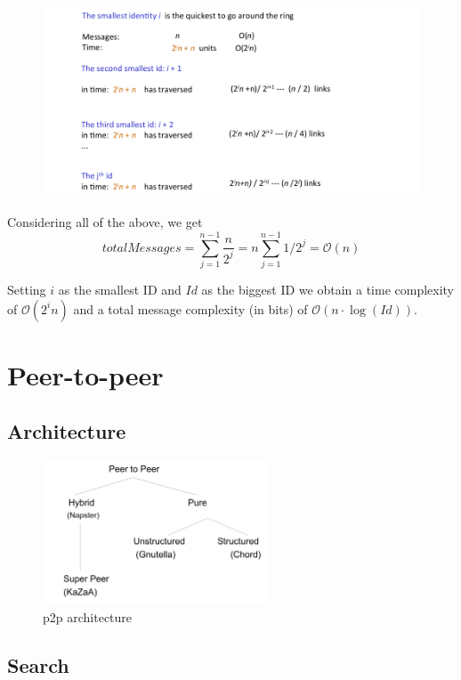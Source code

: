 \documentclass[paper=a4, fontsize=11pt]{scrartcl} %
\numberwithin{equation}{section} %
\numberwithin{figure}{section} %
\numberwithin{table}{section} %
\begin{document}
\begin{figure}[H]
	\centering
	\includegraphics[width=\linewidth]{img/min_finding_ring}
	\caption{}
	\label{fig:minfindingring}
\end{figure}

Considering all of the above, we get $$totalMessages = \sum_{j = 1}^{n-1} \frac{n}{2^j}= n\sum_{j = 1}^{n-1}1/2^j = \mathcal{O}(n)$$ 

Setting $i$ as the smallest ID and $Id$ as the biggest ID we obtain a time complexity of $\mathcal{O}(2^in)$ and a total message complexity (in bits) of $\mathcal{O}(n\cdot \log(Id))$.



\section*{Peer-to-peer}
\subsection*{Architecture}
\begin{figure}[H]
  \centering
  \includegraphics[width=0.6\textwidth]{img/p2p.png}
  \caption{p2p architecture}
  \label{fig:boat1}
\end{figure}

\subsection*{Search}
\end{document}
